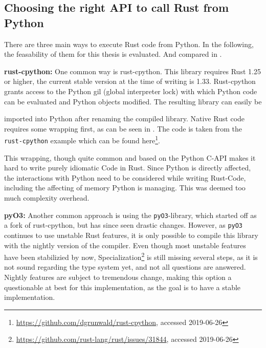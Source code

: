 \subsection{Choosing the right API to call Rust from Python}\label{sec:api}

There are three main ways to execute Rust code from Python. In the following,
the feasability of them for this thesis is evaluated. And compared in
.

\begin{stretchpars}
\textbf{rust-cpython:} One common way is rust-cpython. This library requires
Rust 1.25 or higher, the current stable version at the time of writing is 1.33.
Rust-cpython grants access to the Python gil (global interpreter lock) with
which Python code can be evaluated and Python objects modified. The resulting
library can easily be
\end{stretchpars}


imported into Python after renaming the compiled library. Native Rust code
requires some wrapping first, as can be seen in . The code is
taken from the \verb|rust-cpython| example which can be found
here\footnote{\url{https://github.com/dgrunwald/rust-cpython}, accessed
2019-06-26}. 

This wrapping, though quite common and based on the Python C-API makes
it hard to write purely idiomatic Code in Rust. Since Python is directly
affected, the interactions with Python need to be considered while writing
Rust-Code, including the affecting of memory Python is managing. This was
deemed too much complexity overhead.


\textbf{pyO3:} Another common approach is using the \verb|pyO3|-library, which
started off as a fork of rust-cpython, but has since seen drastic changes.
However, as \verb|pyO3| continues to use unstable Rust features, it is only
possible to compile this library with the nightly version of the compiler. Even
though most unstable features have been stabilizied by now,
Specialization\footnote{\url{https://github.com/rust-lang/rust/issues/31844},
accessed 2019-06-26} is still missing several steps, as it is not sound
regarding the type system yet, and not all questions are answered. Nightly
features are subject to tremendous change, making this option a questionable at
best for this implementation, as the goal is to have a stable implementation.


